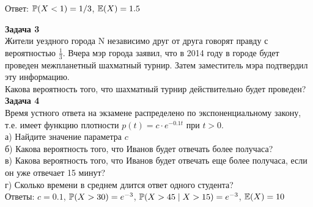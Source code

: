 \documentclass[12pt, a4paper]{article}\usepackage[]{graphicx}\usepackage[]{color}
\begin{document}
	Ответ: $\P(X<1)=1/3$, $\E(X)=1.5$

	\textbf{Задача 3} \\ %
	Жители уездного города N независимо друг от друга говорят правду с вероятностью $\frac{1}{3}$. Вчера мэр города заявил, что в 2014 году в городе будет проведен межпланетный шахматный турнир. Затем заместитель мэра подтвердил эту информацию. \\
	Какова вероятность того, что шахматный турнир действительно будет проведен? \\

	\textbf{Задача 4} \\ %
	Время устного ответа на экзамене распределено по экспоненциальному закону, т.е. имеет функцию плотности $p(t)=c\cdot e^{-0.1t}$ при $t>0$. \\
	а) Найдите значение параметра $c$ \\
	б) Какова вероятность того, что Иванов будет отвечать более получаса? \\
	в) Какова вероятность того, что Иванов будет отвечать еще более получаса, если он уже отвечает 15 минут? \\
	г) Сколько времени в среднем длится ответ одного студента? \\

	Ответы: $c=0.1$, $\P(X>30)=e^{-3}$, $\P(X>45\mid X>15)=e^{-3}$, $\E(X)=10$




\end{document}
